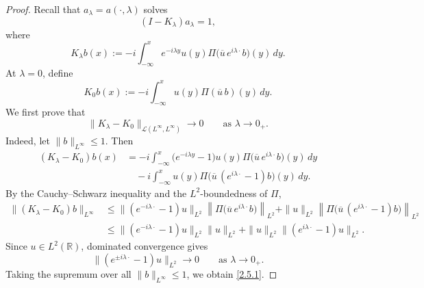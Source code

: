 \documentclass[10pt]{article}
\numberwithin{equation}{section}
\numberwithin{theorem}{section}
\begin{document}
\begin{proof}
Recall that \(a_\lambda=a(\cdot,\lambda)\) solves
\[
(I-K_\lambda)a_\lambda=1,
\]
where
\[
K_\lambda b(x)
:=
-i\int_{-\infty}^x
e^{-i\lambda y}u(y)
\Pi\bigl(\overline u\,e^{i\lambda\cdot}b\bigr)(y)\,dy .
\]
At \(\lambda=0\), define
\[
K_0 b(x)
:=
-i\int_{-\infty}^x
u(y)\Pi(\overline u\,b)(y)\,dy .
\]
We first prove that
\begin{equation}
\label{2.5.1}
\|K_\lambda-K_0\|_{\mathcal L(L^\infty,L^\infty)}
\longrightarrow0
\qquad\text{as }\lambda\to0_{+}.
\end{equation}
Indeed, let \(\|b\|_{L^\infty}\le1\). Then
\[
\begin{aligned}
(K_\lambda-K_0)b(x)
&=
-i\int_{-\infty}^x
\bigl(e^{-i\lambda y}-1\bigr)u(y)
\Pi\bigl(\overline u\,e^{i\lambda\cdot}b\bigr)(y)\,dy  \\
&\quad
-i\int_{-\infty}^x
u(y)
\Pi\bigl(\overline u\,(e^{i\lambda\cdot}-1)b\bigr)(y)\,dy .
\end{aligned}
\]
By the Cauchy--Schwarz inequality and the \(L^2\)-boundedness of \(\Pi\),
\[
\begin{aligned}
\|(K_\lambda-K_0)b\|_{L^\infty}
&\le
\|(e^{-i\lambda\cdot}-1)u\|_{L^2}
\left\|
\Pi\bigl(\overline u\,e^{i\lambda\cdot}b\bigr)
\right\|_{L^2}  
+\|u\|_{L^2}
\left\|
\Pi\bigl(\overline u\,(e^{i\lambda\cdot}-1)b\bigr)
\right\|_{L^2}  \\
&\le
\|(e^{-i\lambda\cdot}-1)u\|_{L^2}\|u\|_{L^2}
+
\|u\|_{L^2}\|(e^{i\lambda\cdot}-1)u\|_{L^2}.
\end{aligned}
\]
Since \(u\in L^2(\mathbb R)\), dominated convergence gives
\[
\|(e^{\pm i\lambda\cdot}-1)u\|_{L^2}
\to0
\qquad\text{as }\lambda\to0_{+}.
\]
Taking the supremum over all \(\|b\|_{L^\infty}\le1\), we obtain \eqref{2.5.1}.


\end{proof}
\end{document}
